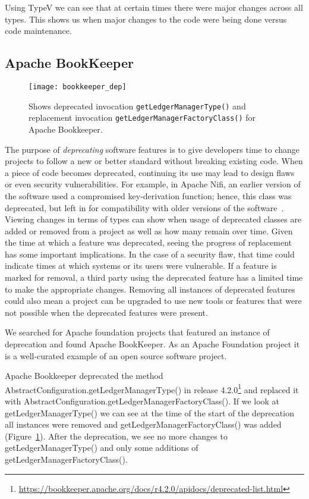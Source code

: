 Using TypeV we can see that at certain times there were major changes across all types. This shows us when major changes to the code were being done versus code maintenance.

\subsection{Apache BookKeeper}

\begin{figure}[!ht]
\centering
\texttt{[image: bookkeeper\_dep]}
\caption{Shows deprecated invocation \texttt{getLedgerManagerType()} and replacement invocation \texttt{getLedgerManagerFactoryClass()} for Apache Bookkeeper.}
\label{fig:bookkeeper-depr}
\end{figure}

The purpose of \emph{deprecating} software features is to give developers time to change projects to follow a new or better standard without breaking existing code. When a piece of code becomes deprecated, continuing its use may lead to design flaws or even security vulnerabilities. For example, in Apache Nifi, an earlier version of the software used a compromised key-derivation function; hence, this class was deprecated, but left in for compatibility with older versions of the software~\cite{nifi}. Viewing changes in terms of types can show when usage of deprecated classes are added or removed from a project as well as how many remain over time. Given the time at which a feature was deprecated, seeing the progress of replacement has some important implications. In the case of a security flaw, that time could indicate times at which systems or its users were vulnerable. If a feature is marked for removal, a third party using the deprecated feature has a limited time to make the appropriate changes. Removing all instances of deprecated features could also mean a project can be upgraded to use new tools or features that were not possible when the deprecated features were present.

We searched for Apache foundation projects that featured an instance of deprecation and found Apache BookKeeper. As an Apache Foundation project it is a well-curated example of an open source software project.

Apache Bookkeeper deprecated the method Abstract\-Configuration.\-get\-Ledger\-Manager\-Type() in release 4.2.0\footnote{\url{https://bookkeeper.apache.org/docs/r4.2.0/apidocs/deprecated-list.html}} and replaced it with Abstract\-Configuration.\-get\-Ledger\-Manager\-Factory\-Class(). If we look at get\-Ledger\-Manager\-Type() we can see at the time of the start of the deprecation all instances were removed and get\-Ledger\-Manager\-Factory\-Class() was added (Figure~\ref{fig:bookkeeper-depr}). After the deprecation, we see no more changes to get\-Ledger\-Manager\-Type() and only some additions of get\-Ledger\-Manager\-Factory\-Class().

